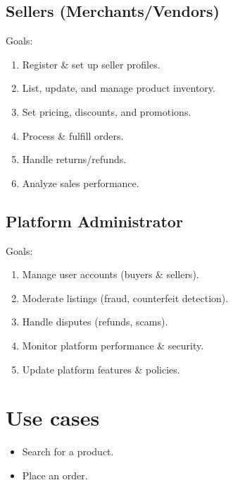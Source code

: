 \documentclass[a4paper,12pt]{article}
\begin{document}
\subsection{Sellers (Merchants/Vendors)}

Goals:

\begin{enumerate}
    \item Register \& set up seller profiles.

    \item List, update, and manage product inventory.

    \item Set pricing, discounts, and promotions.

    \item Process \& fulfill orders.

    \item Handle returns/refunds.

    \item Analyze sales performance.
\end{enumerate}

\subsection{Platform Administrator}

Goals:

\begin{enumerate}
    \item Manage user accounts (buyers \& sellers).

    \item Moderate listings (fraud, counterfeit detection).

    \item Handle disputes (refunds, scams).

    \item Monitor platform performance \& security.

    \item Update platform features \& policies.
\end{enumerate}

\section{Use cases}

\begin{itemize}
    \item Search for a product.
    \item Place an order.
\end{itemize}




\end{document}
